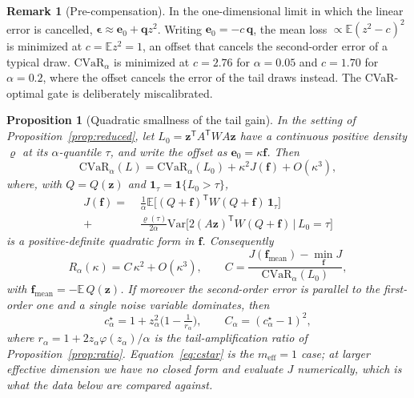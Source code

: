 \documentclass[aps,pra,twocolumn,superscriptaddress,reprint,nofootinbib,floatfix]{revtex4-2}
\newtheorem{proposition}{Proposition}
\theoremstyle{definition}
\newtheorem{remark}{Remark}
\newcommand{\cvar}{\mathrm{CVaR}}
\newcommand{\E}{\mathbb{E}}
\begin{document}
\begin{remark}[Pre-compensation]
\label{rem:precomp}
In the one-dimensional limit in which the linear error is cancelled,
$\bm\epsilon\approx\mathbf e_0+\mathbf qz^2$. Writing
$\mathbf e_0=-c\,\mathbf q$, the mean loss $\propto\E(z^2-c)^2$ is minimized at
$c=\E z^2=1$, an offset that cancels the second-order error of a typical
draw. $\cvar_\alpha$ is minimized at $c=2.76$ for $\alpha=0.05$ and $c=1.70$
for $\alpha=0.2$, where the offset cancels the error of the tail draws
instead. The CVaR-optimal gate is deliberately miscalibrated.
\end{remark}

\begin{proposition}[Quadratic smallness of the tail gain]
\label{prop:kappa2}
In the setting of Proposition~\ref{prop:reduced}, let
$L_0=\mathbf z^{\mathsf T}A^{\mathsf T}WA\mathbf z$ have a continuous positive
density $\varrho$ at its $\alpha$-quantile $\tau$, and write the offset as
$\mathbf e_0=\kappa\mathbf f$. Then
\begin{equation}
\cvar_\alpha(L)=\cvar_\alpha(L_0)+\kappa^2J(\mathbf f)+O(\kappa^3),
\label{eq:Jf}
\end{equation}
where, with $Q=Q(\mathbf z)$ and $\mathbf 1_\tau=\mathbf 1\{L_0>\tau\}$,
\begin{align*}
J(\mathbf f)=\;&\tfrac1\alpha\E\big[(Q+\mathbf f)^{\mathsf T}W(Q+\mathbf f)\,\mathbf 1_\tau\big]\\
+\;&\tfrac{\varrho(\tau)}{2\alpha}\mathrm{Var}\big[2(A\mathbf z)^{\mathsf T}W(Q+\mathbf f)\,\big|\,L_0=\tau\big]
\end{align*}
is a positive-definite quadratic form in $\mathbf f$. Consequently
\begin{equation}
R_\alpha(\kappa)=C\,\kappa^2+O(\kappa^3),\qquad
C=\frac{J(\mathbf f_{\mathrm{mean}})-\min_{\mathbf f}J}{\cvar_\alpha(L_0)},
\label{eq:kappa2}
\end{equation}
with $\mathbf f_{\mathrm{mean}}=-\E\,Q(\mathbf z)$. If moreover the
second-order error is parallel to the first-order one and a single noise
variable dominates, then
\begin{equation}
c^\star_\alpha=1+z_\alpha^2\Big(1-\tfrac1{r_\alpha}\Big),\qquad
C_\alpha=(c^\star_\alpha-1)^2,
\label{eq:cstar}
\end{equation}
where $r_\alpha=1+2z_\alpha\varphi(z_\alpha)/\alpha$ is the tail-amplification
ratio of Proposition~\ref{prop:ratio}. Equation~\eqref{eq:cstar} is the
$m_{\mathrm{eff}}=1$ case; at larger effective dimension we have no closed
form and evaluate $J$ numerically, which is what the data below are compared
against.
\end{proposition}
\end{document}
